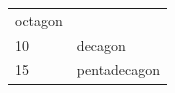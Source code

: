 {\begin{tabular}[t]{|l|l|}
        octagon%
     \tabularnewline\cline{1-1}\cline{2-2}
        10 &
        decagon%
     \tabularnewline\cline{1-1}\cline{2-2}
        15 &
        pentadecagon%
     \tabularnewline\cline{1-1}\cline{2-2}
    \end{tabular}} %
        \addtolength{\mytableboxheight}{\mytableboxdepth}
